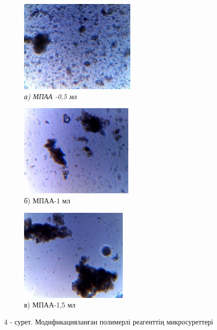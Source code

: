 \begin{figure}[H]
    \centering
    \begin{subfigure}[t]{0.3\textwidth}
        \centering
        \includegraphics[width=\textwidth, height=4.5cm]{media/gorn/image47}
        \caption*{\textit{а) МПАА -0,5 мл}}
    \end{subfigure}
    \begin{subfigure}[t]{0.3\textwidth}
        \centering
        \includegraphics[width=\textwidth, height=4.5cm]{media/gorn/image48}
        \caption*{б) МПАА-1 мл}
    \end{subfigure}
    \begin{subfigure}[t]{0.3\textwidth}
        \centering
        \includegraphics[width=\textwidth, height=4.5cm]{media/gorn/image49}
        \caption*{в) МПАА-1,5 мл}
    \end{subfigure}
    \caption*{4 - сурет. Модификацияланған полимерлі реагенттің микросуреттері}
\end{figure}

